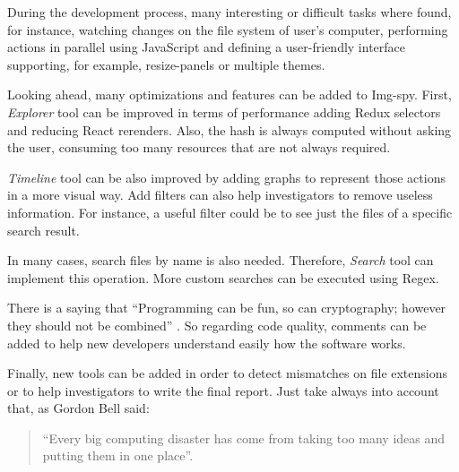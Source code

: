 During the development process, many interesting or difficult tasks where found,
for instance, watching changes on the file system of user's computer, performing
actions in parallel using JavaScript and defining a user-friendly interface
supporting, for example, resize-panels or multiple themes.

Looking ahead, many optimizations and features can be added to Img-spy. First,
\textit{Explorer} tool can be improved in terms of performance adding Redux
selectors and reducing React rerenders. Also, the hash is always computed
without asking the user, consuming too many resources that are not always required.

\textit{Timeline} tool can be also improved by adding graphs to represent those
actions in a more visual way. Add filters can also help investigators to remove
useless information. For instance, a useful filter could be to see just the files
of a specific search result.

In many cases, search files by name is also needed. Therefore, \textit{Search} tool
can implement this operation. More custom searches can be executed using Regex.

There is a saying that “Programming can be fun, so can cryptography; however
they should not be combined” \cite{code-complete}. So regarding code quality,
comments can be added to help new developers understand easily how the software 
works.

Finally, new tools can be added in order to detect mismatches on file 
extensions or to help investigators to write the final report. Just take always
into account that, as Gordon Bell said:

\begin{quote}
	“Every big computing disaster has come from taking too many ideas and putting them in one place”.
\end{quote}